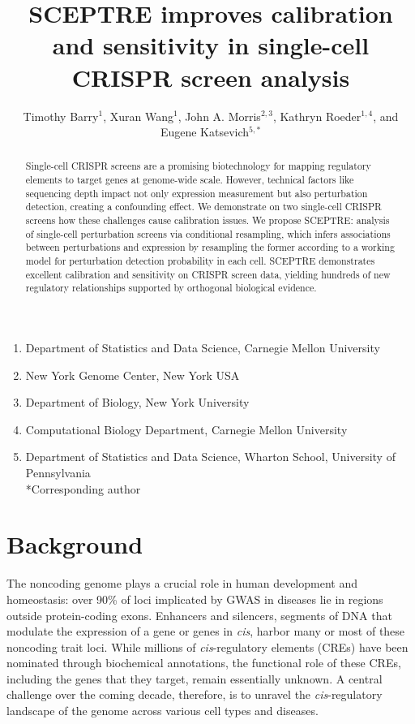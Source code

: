 \documentclass{article}
\title{SCEPTRE improves calibration and sensitivity in single-cell CRISPR screen analysis}
\author{Timothy Barry$^{1}$, Xuran Wang$^1$, John A. Morris$^{2,3}$, Kathryn Roeder$^{1,4}$, and Eugene Katsevich$^{5,*}$}
\begin{document}
\maketitle

\addtocounter{page}{-1}
\thispagestyle{empty}

\begin{enumerate}
 \item Department of Statistics and Data Science, Carnegie Mellon University
 \item New York Genome Center, New York USA
 \item Department of Biology, New York University
 \item Computational Biology Department, Carnegie Mellon University
 \item Department of Statistics and Data Science, Wharton School, University of Pennsylvania \\
\textrm{*}Corresponding author
\end{enumerate}


\begin{abstract}
Single-cell CRISPR screens are a promising biotechnology for mapping regulatory elements to target genes at genome-wide scale. However, technical factors like sequencing depth impact not only expression measurement but also perturbation detection, creating a confounding effect. We demonstrate on two single-cell CRISPR screens how these challenges cause calibration issues. We propose SCEPTRE: analysis of single-cell perturbation screens via conditional resampling, which infers associations between perturbations and expression by resampling the former according to a working model for perturbation detection probability in each cell. SCEPTRE demonstrates excellent calibration and sensitivity on CRISPR screen data, yielding hundreds of new regulatory relationships supported by orthogonal biological evidence.
\end{abstract}

\clearpage
\section*{Background}
The noncoding genome plays a crucial role in human development and homeostasis: over 90\% of loci implicated by GWAS in diseases lie in regions outside protein-coding exons\cite{Gallagher2018}. Enhancers and silencers, segments of DNA that modulate the expression of a gene or genes in \textit{cis}, harbor many or most of these noncoding trait loci. While millions of \textit{cis}-regulatory elements (CREs) have been nominated through biochemical annotations, the functional role of these CREs, including the genes that they target, remain essentially unknown\cite{Gasperini2020}. A central challenge over the coming decade, therefore, is to unravel the \textit{cis}-regulatory landscape of the genome across various cell types and diseases.
\end{document}
